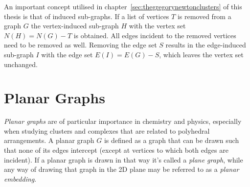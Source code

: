 An important concept utilised in chapter~\ref{sec:thegregorynewtonclusters} of
this thesis is that of induced sub-graphs. If a list of vertices $T$ is removed
from a graph $G$ the vertex-induced sub-graph $H$ with the vertex set
$N(H)=N(G)-T$ is obtained. All edges incident to the removed vertices need to be
removed as well. Removing the edge set $S$ results in the edge-induced sub-graph
$I$ with the edge set $E(I)=E(G)-S$, which leaves the vertex set unchanged.

\section{Planar Graphs}
\label{sec:PlanarGraphs}

\textit{Planar graphs} are of particular importance in chemistry and physics,
especially when studying clusters and complexes that are related to polyhedral
arrangements.  A planar graph $G$ is defined as a graph that can be drawn such
that none of its edges intercept (except at vertices to which both edges are
incident). If a planar graph is drawn in that way it's called a \textit{plane
graph}, while any way of drawing that graph in the 2D plane may be referred to
as a \textit{planar embedding}.

